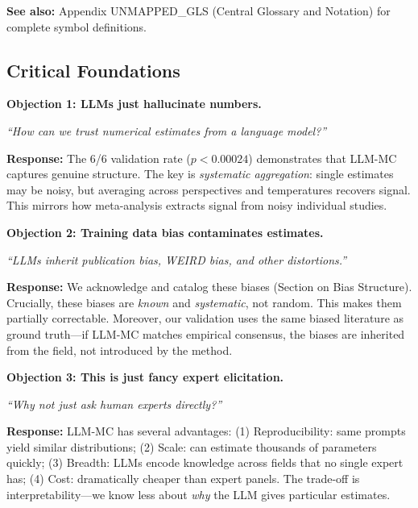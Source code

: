 \textbf{See also:} Appendix UNMAPPED_GLS (Central Glossary and Notation) for complete symbol definitions.


\subsection{Critical Foundations}
\label{sec:AN-foundations}

\begin{tcolorbox}[colback=red!5!white, colframe=red!75!black,
    title=\textbf{Critical Foundations: Objections and Responses}]

\textbf{Objection 1: LLMs just hallucinate numbers.}

\textit{``How can we trust numerical estimates from a language model?''}

\textbf{Response:} The 6/6 validation rate ($p < 0.00024$) demonstrates that LLM-MC
captures genuine structure. The key is \textit{systematic aggregation}: single
estimates may be noisy, but averaging across perspectives and temperatures
recovers signal. This mirrors how meta-analysis extracts signal from noisy
individual studies.

\medskip

\textbf{Objection 2: Training data bias contaminates estimates.}

\textit{``LLMs inherit publication bias, WEIRD bias, and other distortions.''}

\textbf{Response:} We acknowledge and catalog these biases (Section on Bias Structure).
Crucially, these biases are \textit{known} and \textit{systematic}, not random.
This makes them partially correctable. Moreover, our validation uses the same
biased literature as ground truth---if LLM-MC matches empirical consensus,
the biases are inherited from the field, not introduced by the method.

\medskip

\textbf{Objection 3: This is just fancy expert elicitation.}

\textit{``Why not just ask human experts directly?''}

\textbf{Response:} LLM-MC has several advantages: (1) Reproducibility: same prompts
yield similar distributions; (2) Scale: can estimate thousands of parameters
quickly; (3) Breadth: LLMs encode knowledge across fields that no single expert
has; (4) Cost: dramatically cheaper than expert panels. The trade-off is
interpretability---we know less about \textit{why} the LLM gives particular estimates.


\end{tcolorbox}
